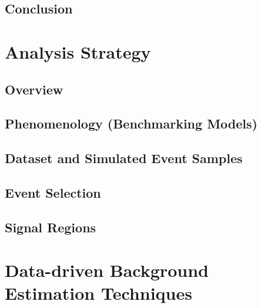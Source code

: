 \documentclass{outhesis}
\begin{document}
\section{Conclusion}\label{sec:roib.concl}


\chapter{Analysis Strategy}\label{chap:strategy}
\graphicspath{{figures/strategy/}}
\section{Overview}\label{sec:strategy.overview}

\section{Phenomenology (Benchmarking Models)}\label{sec:strategy.pheno}

\section{Dataset and Simulated Event Samples}\label{sec:strategy.samples}

\section{Event Selection}\label{sec:strategy.sel}

\section{Signal Regions}\label{sec:strategy.sr}


\chapter{Data-driven Background Estimation Techniques}\label{chap:fake}
\graphicspath{{figures/fake/}}
\end{document}

